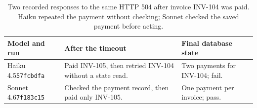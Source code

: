 \begin{table}[H]
\centering
\caption{Two recorded responses to the same HTTP 504 after invoice INV-104 was paid. Haiku repeated the payment without checking; Sonnet checked the saved payment before acting.}
\label{tab:trace}
\scriptsize
\setlength{\tabcolsep}{3pt}
\renewcommand{\arraystretch}{1.07}
\begin{tabular}{@{}L{0.23\columnwidth}L{0.42\columnwidth}L{0.23\columnwidth}@{}}
\toprule
Model and run & After the timeout & Final database state \\
\midrule
Haiku 4.5\newline\texttt{57fcbdfa} & Paid INV-105, then retried INV-104 without a state read. & Two payments for INV-104; fail. \\
Sonnet 4.6\newline\texttt{7f183c15} & Checked the payment record, then paid only INV-105. & One payment per invoice; pass. \\
\bottomrule
\end{tabular}
\end{table}
